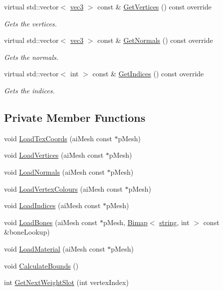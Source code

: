 \begin{DoxyCompactItemize}
virtual std\+::vector$<$ \hyperlink{_types_8h_a3d0ce73e3199de81565fb01632415288}{vec3} $>$ const \& \hyperlink{class_mesh_adfdb5712dc8982d53d972ee6f7c2ace9}{Get\+Vertices} () const  override
\begin{DoxyCompactList}\small\item\em Gets the vertices. \end{DoxyCompactList}\item 
virtual std\+::vector$<$ \hyperlink{_types_8h_a3d0ce73e3199de81565fb01632415288}{vec3} $>$ const \& \hyperlink{class_mesh_aa050192f8e3c114a595390ddff507223}{Get\+Normals} () const  override
\begin{DoxyCompactList}\small\item\em Gets the normals. \end{DoxyCompactList}\item 
virtual std\+::vector$<$ int $>$ const \& \hyperlink{class_mesh_abecd7ad5d8629212b4fe24c87b6cafdd}{Get\+Indices} () const  override
\begin{DoxyCompactList}\small\item\em Gets the indices. \end{DoxyCompactList}\end{DoxyCompactItemize}
\subsection*{Private Member Functions}
\begin{DoxyCompactItemize}
\item 
void \hyperlink{class_mesh_a24c7c604d9c452d3f1c6c554e8d4a947}{Load\+Tex\+Coords} (ai\+Mesh const $\ast$p\+Mesh)
\item 
void \hyperlink{class_mesh_aa7bc703b77e0bdfcb5e0ca9d501c76f5}{Load\+Vertices} (ai\+Mesh const $\ast$p\+Mesh)
\item 
void \hyperlink{class_mesh_a9d31f365bf7234de49b6174da1c26d59}{Load\+Normals} (ai\+Mesh const $\ast$p\+Mesh)
\item 
void \hyperlink{class_mesh_a16e015cb11cdb0fe19c8c2890baf70ef}{Load\+Vertex\+Colours} (ai\+Mesh const $\ast$p\+Mesh)
\item 
void \hyperlink{class_mesh_aabd8093c9c7ad3798788a7f4c8f99749}{Load\+Indices} (ai\+Mesh const $\ast$p\+Mesh)
\item 
void \hyperlink{class_mesh_aa78facba5ece5befd4714245a71743af}{Load\+Bones} (ai\+Mesh const $\ast$p\+Mesh, \hyperlink{class_bimap}{Bimap}$<$ \hyperlink{_types_8h_ad453f9f71ce1f9153fb748d6bb25e454}{string}, int $>$ const \&bone\+Lookup)
\item 
void \hyperlink{class_mesh_aa46d25e3a6f35c2a2d29328deb5d94df}{Load\+Material} (ai\+Mesh const $\ast$p\+Mesh)
\item 
void \hyperlink{class_mesh_a563b0d3d387217053f1af6db1aa00cfe}{Calculate\+Bounds} ()
\item 
int \hyperlink{class_mesh_aefa23899668cfbc296a075add2d36057}{Get\+Next\+Weight\+Slot} (int vertex\+Index)
\end{DoxyCompactItemize}
